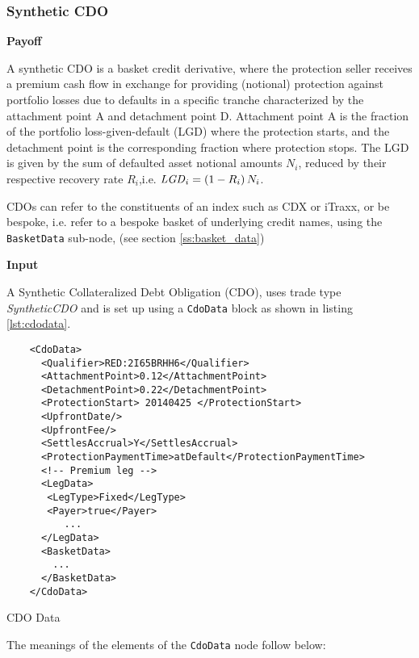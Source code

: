 \subsubsection{Synthetic CDO}

{\bf Payoff}

A synthetic CDO is a basket credit derivative, where
the protection seller receives a premium cash flow in exchange for providing (notional)
protection against portfolio losses due to defaults in a specific tranche characterized by
the attachment point A and detachment point D.
Attachment point A is the fraction of the portfolio loss-given-default
(LGD) where the protection starts, and the detachment
point is the corresponding fraction where protection stops. The LGD is
given by the sum of defaulted asset notional amounts $N_i$, reduced by
their respective recovery rate $R_i$,i.e. $\mathit{LGD}_i =(1-R_i)\,N_i$.

CDOs can refer to the constituents of an index such as CDX or iTraxx, or be bespoke, i.e. refer to a bespoke basket of underlying credit names, using the \lstinline!BasketData! sub-node, (see section \ref{ss:basket_data})

{\bf Input}

A Synthetic Collateralized Debt Obligation (CDO), uses trade type \emph{SyntheticCDO} and is set up using a {\tt  CdoData} block as shown in listing \ref{lst:cdodata}.

\begin{listing}[H]
\begin{verbatim}
    <CdoData>
      <Qualifier>RED:2I65BRHH6</Qualifier>
      <AttachmentPoint>0.12</AttachmentPoint>
      <DetachmentPoint>0.22</DetachmentPoint>
      <ProtectionStart> 20140425 </ProtectionStart>
      <UpfrontDate/>
      <UpfrontFee/>
      <SettlesAccrual>Y</SettlesAccrual>
      <ProtectionPaymentTime>atDefault</ProtectionPaymentTime>
      <!-- Premium leg -->
      <LegData>
       <LegType>Fixed</LegType>
       <Payer>true</Payer>
          ...
      </LegData>
      <BasketData>
        ...
      </BasketData>
    </CdoData>
\end{verbatim}
\caption{CDO Data}
\label{lst:cdodata}
\end{listing}

The meanings of the elements of the {\tt CdoData}  node follow below:

